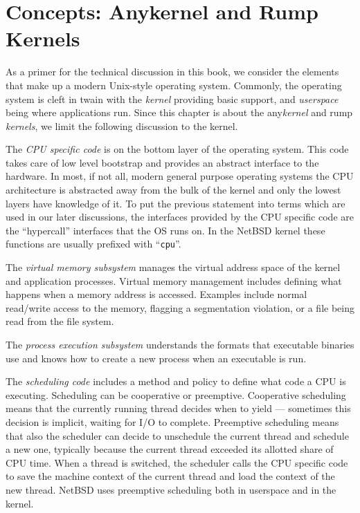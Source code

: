 
\section{Concepts: Anykernel and Rump Kernels}
\label{chap:concept}

As a primer for the technical discussion in this book, we consider the
elements that make up a modern Unix-style operating system.  Commonly,
the operating system is cleft in twain with the \textit{kernel} providing
basic support, and \textit{userspace} being where applications run.  Since
this chapter is about the any\textit{kernel} and rump \textit{kernels},
we limit the following discussion to the kernel.

The \textit{CPU specific code} is on the bottom layer of the
operating system.  This code takes care of low level bootstrap and provides an
abstract interface to the hardware.  In most, if not all, modern
general purpose operating systems the CPU architecture is abstracted away
from the bulk of the kernel and only the lowest layers have knowledge
of it.  To put the previous statement into terms which are used in our
later discussions, the interfaces provided by the CPU specific code are
the ``hypercall'' interfaces that the OS runs on.  In the NetBSD
kernel these functions are usually prefixed with ``\texttt{cpu}''.

The \textit{virtual memory subsystem} manages the virtual address space of
the kernel and application processes.  Virtual memory management includes defining what
happens when a memory address is accessed.  Examples include
normal read/write access to the memory, flagging a segmentation violation,
or a file being read from the file system.

The \textit{process execution subsystem} understands the formats that
executable binaries use and knows how to create a new process when an
executable is run.

The \textit{scheduling code} includes a method and policy to define what
code a CPU is executing.  Scheduling can be cooperative or preemptive.
Cooperative scheduling means that the currently running thread decides when
to yield --- sometimes this decision is implicit, \eg waiting
for I/O to complete.  Preemptive scheduling means that also the scheduler
can decide to unschedule the current thread and schedule a new one,
typically because the current thread exceeded its allotted share of CPU
time.  When a thread is switched, the scheduler calls the CPU specific
code to save the machine context of the current thread and load the
context of the new thread.  NetBSD uses preemptive scheduling both in
userspace and in the kernel.

